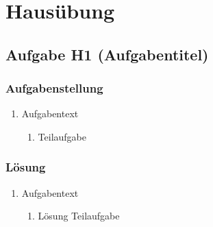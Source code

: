 \documentclass{article}
\title{\MyDocTitle{}}
\author{\MyDocAuthor{}}
\date{\MyDocDate{}}
\begin{document}
\renewcommand{\seriesname}{Aufgabe}
\setcounter{exerciseseries}{0}

\maketitle

\tableofcontents

\newpage

%
%
%       
%
%
%

\section{Hausübung}

\subsection{Aufgabe H1 {\normalfont (Aufgabentitel)}}

\subsubsection{Aufgabenstellung}
\begin{enumerate}[label=(\alph*)]
	\item Aufgabentext
		\begin{enumerate}[label=(\roman*)]
			\item Teilaufgabe
		\end{enumerate}
\end{enumerate}

\subsubsection{Lösung}
\begin{enumerate}[label=(\alph*)]
	\item Aufgabentext
		\begin{enumerate}[label=(\roman*)]
			\item Lösung Teilaufgabe
		\end{enumerate}
\end{enumerate}
\end{document}
